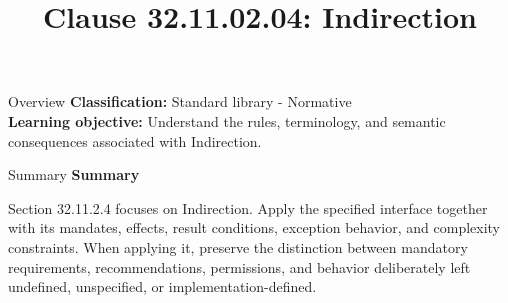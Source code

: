 \documentclass[10pt,letterpaper]{article}
\title{Clause 32.11.02.04: Indirection}
\author{}
\date{}
\begin{document}
\maketitle
\begin{CornellOverviewBox}{Overview}
\textbf{Classification:} Standard library - Normative\\[2pt]
\textbf{Learning objective:} Understand the rules, terminology, and semantic consequences associated with Indirection.
\end{CornellOverviewBox}\begin{CornellSummaryBox}{Summary}
{\sffamily\bfseries\color{Accent} Summary}\par\vspace{3pt}Section 32.11.2.4 focuses on Indirection. Apply the specified interface together with its mandates, effects, result conditions, exception behavior, and complexity constraints. When applying it, preserve the distinction between mandatory requirements, recommendations, permissions, and behavior deliberately left undefined, unspecified, or implementation-defined.
\end{CornellSummaryBox}
\end{document}
